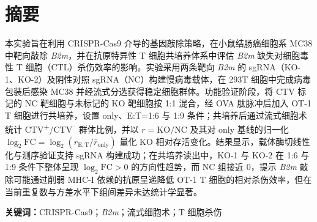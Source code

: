 \section*{摘要}

本实验旨在利用 CRISPR-Cas9 介导的基因敲除策略，在小鼠结肠癌细胞系 MC38 中靶向敲除 \textit{B2m}，并在抗原特异性 T 细胞共培养体系中评估 \textit{B2m} 缺失对细胞毒性 T 细胞（CTL）杀伤效率的影响。实验采用两条靶向 \textit{B2m} 的 sgRNA（KO-1、KO-2）及阴性对照 sgRNA（NC）构建慢病毒载体，在 293T 细胞中完成病毒包装后感染 MC38 并经流式分选获得稳定细胞群体。功能验证阶段，将 CTV 标记的 NC 靶细胞与未标记的 KO 靶细胞按 1:1 混合，经 OVA 肽脉冲后加入 OT-1 T 细胞进行共培养，设置 only、E:T=1:6 与 1:9 条件；共培养后通过流式细胞术统计 CTV\textsuperscript{+}/CTV\textsuperscript{--} 群体比例，并以 \(r=\mathrm{KO}/\mathrm{NC}\) 及其对 only 基线的归一化 \(\log_2\mathrm{FC}=\log_2(r_{\mathrm{E:T}}/\bar r_{\mathrm{only}})\) 量化 KO 相对存活变化。结果显示，载体酶切线性化与测序验证支持 sgRNA 构建成功；在共培养读出中，KO-1 与 KO-2 在 1:6 与 1:9 条件下整体呈现 \(\log_2\mathrm{FC}>0\) 的方向性趋势，而 NC 组接近 0，提示 \textit{B2m} 敲除可能通过削弱 MHC-I 依赖的抗原呈递降低 OT-1 T 细胞的相对杀伤效率，但在当前重复数与方差水平下组间差异未达统计学显著。

\vspace{0.5cm}

\noindent\textbf{关键词：}CRISPR-Cas9；\textit{B2m}；流式细胞术；T 细胞杀伤

\newpage
